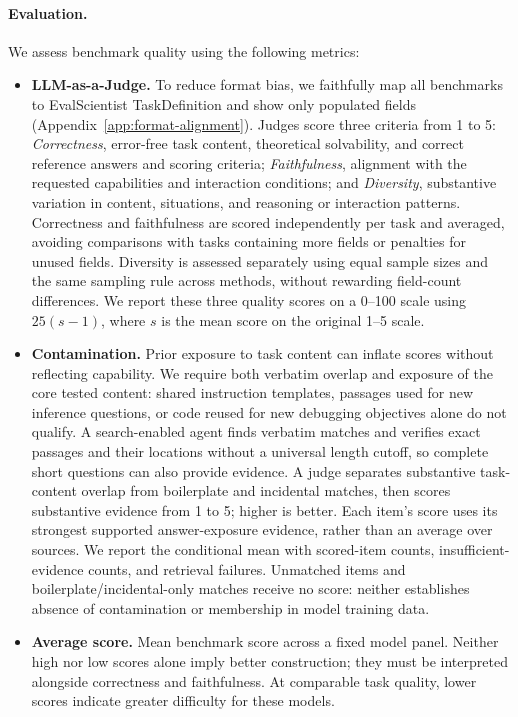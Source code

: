 \documentclass{article} %
\begin{document}
	\paragraph{Evaluation.}
	We assess benchmark quality using the following metrics:
	\begin{itemize}
		\item \textbf{LLM-as-a-Judge.} To reduce format bias, we faithfully map
		all benchmarks to EvalScientist TaskDefinition and show only populated fields
		(Appendix~\ref{app:format-alignment}). Judges score three criteria from 1 to 5:
		\emph{Correctness}, error-free task content, theoretical solvability, and
		correct reference answers and scoring criteria; \emph{Faithfulness}, alignment
		with the requested capabilities and interaction conditions; and
		\emph{Diversity}, substantive variation in content, situations, and reasoning
		or interaction patterns. Correctness and faithfulness are scored independently
		per task and averaged, avoiding comparisons with tasks containing more fields
		or penalties for unused fields. Diversity is assessed separately using equal
		sample sizes and the same sampling rule across methods, without rewarding
		field-count differences.
		We report these three quality scores on a 0--100 scale using $25(s-1)$,
		where $s$ is the mean score on the original 1--5 scale.
		\item \textbf{Contamination.} Prior exposure to task content can inflate
		scores without reflecting capability. We require both verbatim overlap and
		exposure of the core tested content: shared instruction templates, passages
		used for new inference questions, or code reused for new debugging objectives
		alone do not qualify. A search-enabled agent finds verbatim matches and
		verifies exact passages and their locations without a universal length cutoff,
		so complete short questions can also provide evidence. A judge separates
		substantive task-content overlap from boilerplate and incidental matches,
		then scores substantive evidence from 1 to 5; higher is better. Each item's
		score uses its strongest supported answer-exposure evidence, rather than an
		average over sources. We report the conditional mean with scored-item counts,
		insufficient-evidence counts, and retrieval failures. Unmatched items and
		boilerplate/incidental-only matches receive no score: neither establishes
		absence of contamination or membership in model training data.
		\item \textbf{Average score.} Mean benchmark score across a fixed model
		panel. Neither high nor low scores alone imply better construction; they
		must be interpreted alongside correctness and faithfulness. At comparable
		task quality, lower scores indicate greater difficulty for these models.
	\end{itemize}
	
\end{document}
